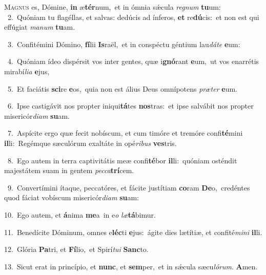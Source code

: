 \lettrine{\initial\textcolor{\initialcolor}{M}}{agnus} es, Dómine, \textbf{in} æ\-\textbf{tér}\-num,~\star et in ómnia sǽcula \textit{re}\-\textit{gnum} \textbf{tu}\-um:\\
{\numbfont\textcolor{\numbcolor}{~2.}}~Quóniam tu flagéllas, et salvas: dedúcis ad ínferos, \textbf{et} re\-\textbf{dú}\-cis:~\star et non est qui effúgiat \textit{ma}\-\textit{num} \textbf{tu}\-am.\par
{\numbfont\textcolor{\numbcolor}{~3.}}~Confitémini Dómino, \textbf{fí}\-lii \textbf{Is}\-raël,~\star et in conspéctu géntium lau\-\textit{dá}\-\textit{te} \textbf{e}\-um:\par
{\numbfont\textcolor{\numbcolor}{~4.}}~Quóniam ídeo dispérsit vos inter gentes, quæ i\-\textbf{gnó}\-rant \textbf{e}\-um,~\star ut vos enarrétis mirabí\-\textit{li}\-\textit{a} \textbf{e}\-jus,\par
{\numbfont\textcolor{\numbcolor}{~5.}}~Et faciátis \textbf{sci}\-re \textbf{e}\-os,~\star quia non est álius Deus omnípotens \textit{præ}\-\textit{ter} \textbf{e}\-um.\par
{\numbfont\textcolor{\numbcolor}{~6.}}~Ipse castigávit nos propter iniqui\-\textbf{tá}\-tes \textbf{nos}\-tras:~\star et ipse salvábit nos propter misericór\-\textit{di}\-\textit{am} \textbf{su}\-am.\par
{\numbfont\textcolor{\numbcolor}{~7.}}~Aspícite ergo quæ fecit nobíscum, et cum timóre et tremóre confi\-\textbf{té}\-mini \textbf{il}\-li:~\star Regémque sæculórum exaltáte in opé\-\textit{ri}\-\textit{bus} \textbf{ves}\-tris.\par
{\numbfont\textcolor{\numbcolor}{~8.}}~Ego autem in terra captivitátis meæ confi\-\textbf{té}\-bor \textbf{il}\-li:~\star quóniam osténdit majestátem suam in gentem \textit{pec}\-\textit{ca}\textbf{trí}cem.\par
{\numbfont\textcolor{\numbcolor}{~9.}}~Convertímini ítaque, peccatóres, et fácite justítiam \textbf{co}\-ram \textbf{De}\-o,~\star credéntes quod fáciat vobíscum misericór\-\textit{di}\-\textit{am} \textbf{su}\-am:\par
{\numbfont\textcolor{\numbcolor}{10.}}~Ego autem, et \textbf{á}\-nima \textbf{me}\-a~\star in e\textit{o} \textit{læ}\-\textbf{tá}bimur.\par
{\numbfont\textcolor{\numbcolor}{11.}}~Benedícite Dóminum, omnes e\-\textbf{léc}\-ti \textbf{e}\-jus:~\star ágite dies lætítiæ, et confité\-\textit{mi}\-\textit{ni} \textbf{il}\-li.\par
{\numbfont\textcolor{\numbcolor}{12.}}~Glória \textbf{Pa}\-tri, et \textbf{Fí}\-lio,~\star et Spirí\-\textit{tu}\-\textit{i} \textbf{Sanc}\-to.\par
{\numbfont\textcolor{\numbcolor}{13.}}~Sicut erat in princípio, et \textbf{nunc}\-, et \textbf{sem}\-per,~\star et in sǽcula sæcu\-\textit{ló}\-\textit{rum}. \textbf{A}\-men.\par
